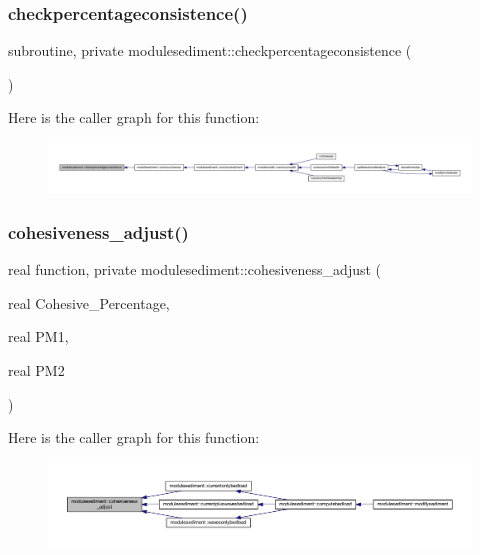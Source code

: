\subsubsection{\texorpdfstring{checkpercentageconsistence()}{checkpercentageconsistence()}}
{\footnotesize\ttfamily subroutine, private modulesediment\+::checkpercentageconsistence (\begin{DoxyParamCaption}{ }\end{DoxyParamCaption})\hspace{0.3cm}{\ttfamily [private]}}

Here is the caller graph for this function\+:\nopagebreak
\begin{figure}[H]
\begin{center}
\leavevmode
\includegraphics[width=350pt]{namespacemodulesediment_ab89eafb956bc952759092de44da7a0b8_icgraph}
\end{center}
\end{figure}
\mbox{\label{namespacemodulesediment_afbd767a170502bf18b5849039940895d}} 
\subsubsection{\texorpdfstring{cohesiveness\+\_\+adjust()}{cohesiveness\_adjust()}}
{\footnotesize\ttfamily real function, private modulesediment\+::cohesiveness\+\_\+adjust (\begin{DoxyParamCaption}\item[{real}]{Cohesive\+\_\+\+Percentage,  }\item[{real}]{P\+M1,  }\item[{real}]{P\+M2 }\end{DoxyParamCaption})\hspace{0.3cm}{\ttfamily [private]}}

Here is the caller graph for this function\+:\nopagebreak
\begin{figure}[H]
\begin{center}
\leavevmode
\includegraphics[width=350pt]{namespacemodulesediment_afbd767a170502bf18b5849039940895d_icgraph}
\end{center}
\end{figure}
\mbox{\label{namespacemodulesediment_a7f0383935c0a22b77c959d32f6fa82e5}} 
